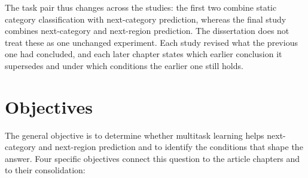 The task pair thus changes across the studies: the first two combine static category
classification with next-category prediction, whereas the final study combines
next-category and next-region prediction. The dissertation does not treat these as one
unchanged experiment. Each study revised what the previous one had concluded, and each
later chapter states which earlier conclusion it supersedes and under which conditions
the earlier one still holds.


\section{Objectives}
\label{sec:intro:objectives}

The general objective is to determine whether multitask learning helps next-category
and next-region prediction and to identify the conditions that shape the answer. Four
specific objectives connect this question to the article chapters and to their
consolidation:

